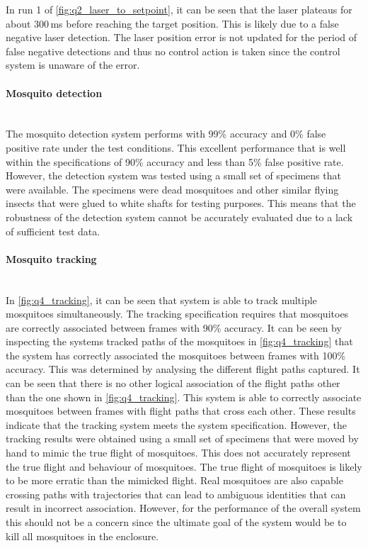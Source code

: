 In run 1 of \autoref{fig:q2_laser_to_setpoint}, it can be seen that the laser plateaus for about 300\,ms before reaching the target position. This is likely due to a false negative laser detection. The laser position error is not updated for the period of false negative detections and thus no control action is taken since the control system is unaware of the error.


\paragraph{Mosquito detection}\hfill\\
The mosquito detection system performs with 99\% accuracy and 0\% false positive rate under the test conditions. This excellent performance that is well within the specifications of 90\% accuracy and less than 5\% false positive rate. However, the detection system was tested using a small set of  specimens that were available. The specimens were dead mosquitoes and other similar flying insects that were glued to white shafts for testing purposes. This means that the robustness of the detection system cannot be accurately evaluated due to a lack of sufficient test data.


\paragraph{Mosquito tracking}\hfill\\
In \autoref{fig:q4_tracking}, it can be seen that system is able to track multiple mosquitoes simultaneously. The tracking specification requires that mosquitoes are correctly associated between frames with 90\% accuracy. It can be seen by inspecting the systems tracked paths of the mosquitoes in \autoref{fig:q4_tracking} that the system has correctly associated the mosquitoes between frames with 100\% accuracy. This was determined by analysing the different flight paths captured. It can be seen that there is no other logical association of the flight paths other than the one shown in \autoref{fig:q4_tracking}. This system is able to correctly associate mosquitoes between frames with flight paths that cross each other. These results indicate that the tracking system meets the system specification. However, the tracking results were obtained using a small set of specimens that were moved by hand to mimic the true flight of mosquitoes. This does not accurately represent the true flight and behaviour of mosquitoes. The true flight of mosquitoes is likely to be more erratic than the mimicked flight. Real mosquitoes are also capable crossing paths with trajectories that can lead to ambiguous identities that can result in incorrect association. However, for the performance of the overall system this should not be a concern since the ultimate goal of the system would be to kill all mosquitoes in the enclosure.

